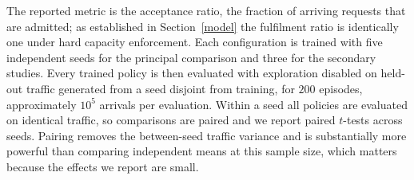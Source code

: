 \documentclass[10pt,journal,comsoc]{IEEEtran}
\begin{document}
The reported metric is the acceptance ratio, the fraction of arriving
requests that are admitted; as established in Section~\ref{model} the
fulfilment ratio is identically one under hard capacity enforcement. Each
configuration is trained with five independent seeds for the principal
comparison and three for the secondary studies. Every trained policy is
then evaluated with exploration disabled on held-out traffic generated
from a seed disjoint from training, for $200$ episodes, approximately
$10^5$ arrivals per evaluation. Within a seed all policies are evaluated
on identical traffic, so comparisons are paired and we report paired
$t$-tests across seeds. Pairing removes the between-seed traffic variance
and is substantially more powerful than comparing independent means at
this sample size, which matters because the effects we report are small.
\end{document}
